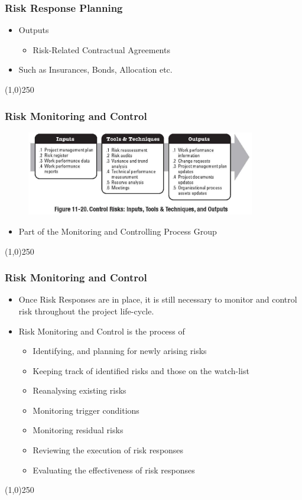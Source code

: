 \begin{frame}
\frametitle{Risk Response Planning}
\begin{itemize}
\item Outputs
\begin{itemize}
	\item Risk-Related Contractual Agreements
\end{itemize}
\item Such as Insurances, Bonds, Allocation etc.
\end{itemize}
\end{frame}\begin{center}\line(1,0){250}\end{center}




\begin{frame}
\frametitle{Risk Monitoring and Control}
\begin{figure}
	\centering
		\includegraphics[width = 10cm]{images/fig11-20.jpg}
	\label{fig:11-20}
\end{figure}
\begin{itemize}
\item Part of the Monitoring and Controlling Process Group
\end{itemize}
\end{frame}\begin{center}\line(1,0){250}\end{center}


\begin{frame}
\frametitle{Risk Monitoring and Control}
\begin{itemize}
\item Once Risk Responses are in place, it is still necessary to monitor and control risk throughout the project life-cycle.
\item Risk Monitoring and Control is the process of 
\begin{itemize}
	\item Identifying, and planning for newly arising risks 
\item Keeping track of identified risks and those on the watch-list
\item Reanalysing existing risks
\item Monitoring trigger conditions
\item Monitoring residual risks
\item Reviewing the execution of risk responses
\item Evaluating the effectiveness of risk responses 
\end{itemize}
\end{itemize}
\end{frame}\begin{center}\line(1,0){250}\end{center}


